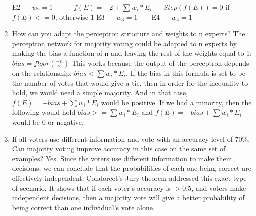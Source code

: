 \documentclass{article}
\begin{document}
\begin{enumerate}
        E2 --- $w_2 = 1$ ------- $f(E) = -2 + \sum w_i * E_i$ --- $Step(f(E)) = 0$ if $f(E) <= 0$, otherwise 1
        \newline
        E3 --- $w_3 = 1$ ----
        \newline
        E4 --- $w_4 = 1$ --
        \newline
        \item How can you adapt the perceptron structure and weights to n experts?
        \newline
        The perceptron network for majority voting could be adapted to n experts by making the bias a function of n and leaving the rest of the weights equal to 1:
        \newline
        $bias = floor(\frac{-n}{2})$
        \newline
        This works because the output of the perceptron depends on the relationship: $bias < \sum w_i * E_i$. If the bias in this formula is set to be the number of votes that would give a tie, then in order for the inequality to hold, we would need a simple majority. And in that case, $f(E) = -bias + \sum w_i * E_i $ would be positive. If we had a minority, then the following would hold $bias >= \sum w_i * E_i$ and $f(E) = -bias + \sum w_i * E_i $ would be 0 or negative.
        \item If all voters use different information and vote with an accuracy level of 70\%. Can majority voting improve accuracy in this case on the same set of examples?
        \newline
        Yes. Since the voters use different information to make their decisions, we can conclude that the probabilities of each one being correct are effectively independent. 
        \newline
        Condorcet's Jury theorem addressed this exact type of scenario. It shows that if each voter's accuracy is $>0.5$, and voters make independent decisions, then a majority vote will give a better probability of being correct than one individual's vote alone.
    \end{enumerate}
    
    \newpage
\end{document}

